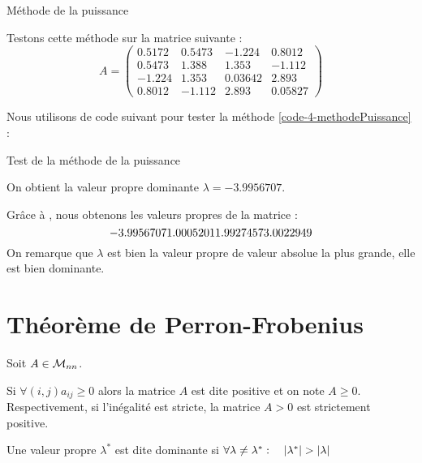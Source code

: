 	\begin{listing}[H]
		\caption{Méthode de la puissance}
		\label{code-4-methodePuissance}
	\end{listing}

	Testons cette méthode sur la matrice suivante :
	\begin{equation}
		A = \begin{pmatrix}
				0.5172	& 0.5473	& -1.224	& 0.8012 	\\
				0.5473	& 1.388		& 1.353		& -1.112 	\\
				-1.224	& 1.353		& 0.03642	& 2.893 	\\
				0.8012	& -1.112	& 2.893		& 0.05827
		\end{pmatrix}
	\end{equation}

	Nous utilisons de code suivant pour tester la méthode \ref{code-4-methodePuissance} :

	\begin{listing}[H]
		\caption{Test de la méthode de la puissance}
		\label{code-4-testPuissance}
	\end{listing}

	On obtient la valeur propre dominante $\lambda = -3.9956707$.

	Grâce à , nous obtenons les valeurs propres de la matrice :
	$$
		-3.9956707 		\hfill
		1.0005201		\hfill
		1.9927457		\hfill
		3.0022949		
	$$
	On remarque que $\lambda$ est bien la valeur propre de valeur absolue la plus grande, elle est bien dominante.

\section{Théorème de Perron-Frobenius}

	Soit $A \in \mathcal{M}_{nn}$.
	\begin{definition}
		\label{def-4-matPositive}
		Si $\forall (i,j) a_{ij} \geq 0 $ alors la matrice $A$ est dite positive et on note $A\geq 0$.
		Respectivement, si l'inégalité est stricte, la matrice $A>0$ est strictement positive.
	\end{definition}

	\begin{definition}
		\label{def-4-vpDominante}
		Une valeur propre $\lambda^*$ est dite dominante si $\forall \lambda \neq \lambda^* :\quad \lvert \lambda^* \rvert > \lvert \lambda \rvert$
	\end{definition}

